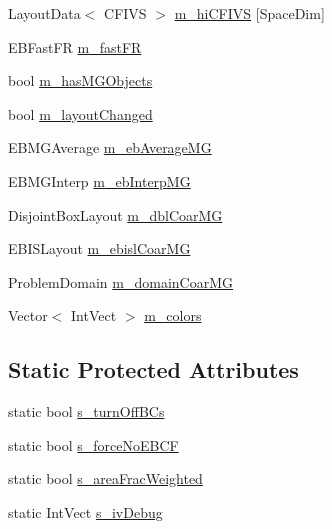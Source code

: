 \begin{DoxyCompactItemize}
\item 
Layout\+Data$<$ C\+F\+I\+VS $>$ \hyperlink{classebconductivityop_a2231a77b78b316f70d25a80729b9de91}{m\+\_\+hi\+C\+F\+I\+VS} \mbox{[}Space\+Dim\mbox{]}
\item 
E\+B\+Fast\+FR \hyperlink{classebconductivityop_a3ebb18273aedcb3b8d411defa0bc61d6}{m\+\_\+fast\+FR}
\item 
bool \hyperlink{classebconductivityop_a6a5617d49ef517035f5810554509e1b7}{m\+\_\+has\+M\+G\+Objects}
\item 
bool \hyperlink{classebconductivityop_acd4bd42bd2eb827a11a6f548fad5e6fd}{m\+\_\+layout\+Changed}
\item 
E\+B\+M\+G\+Average \hyperlink{classebconductivityop_af1b5f3fa9911431b84a4fc2cc1f2d8f1}{m\+\_\+eb\+Average\+MG}
\item 
E\+B\+M\+G\+Interp \hyperlink{classebconductivityop_aaefb7a43ec6b21b2e90f942a02fb0f5b}{m\+\_\+eb\+Interp\+MG}
\item 
Disjoint\+Box\+Layout \hyperlink{classebconductivityop_ad68e0a1bebe988eee7f6742beaf60839}{m\+\_\+dbl\+Coar\+MG}
\item 
E\+B\+I\+S\+Layout \hyperlink{classebconductivityop_a1d5158f394a9f1c92cbabf9b7f16e0bb}{m\+\_\+ebisl\+Coar\+MG}
\item 
Problem\+Domain \hyperlink{classebconductivityop_aa3b9d52aabbfb94983ebc6627afeeea6}{m\+\_\+domain\+Coar\+MG}
\item 
Vector$<$ Int\+Vect $>$ \hyperlink{classebconductivityop_a563b09a50a5293e55ece178315da3bbe}{m\+\_\+colors}
\end{DoxyCompactItemize}
\subsection*{Static Protected Attributes}
\begin{DoxyCompactItemize}
\item 
static bool \hyperlink{classebconductivityop_abcd7d0aa025a488ff45ee53c9fa8627a}{s\+\_\+turn\+Off\+B\+Cs}
\item 
static bool \hyperlink{classebconductivityop_a0e737f803b795c6fa277106985376afe}{s\+\_\+force\+No\+E\+B\+CF}
\item 
static bool \hyperlink{classebconductivityop_a9bba46a62c1aafeb6ae8f8cb46e17cc5}{s\+\_\+area\+Frac\+Weighted}
\item 
static Int\+Vect \hyperlink{classebconductivityop_adcdfdebdbe5231de31394ccd7db44176}{s\+\_\+iv\+Debug}
\end{DoxyCompactItemize}
